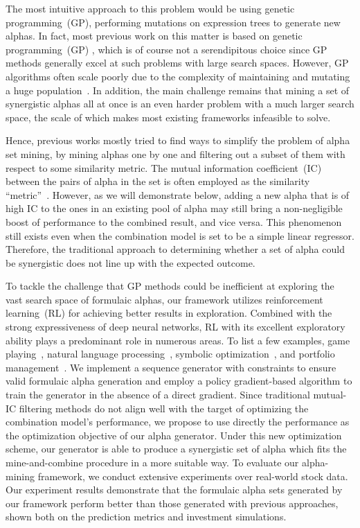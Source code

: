 The most intuitive approach to this problem would be using genetic programming~(GP), performing mutations on expression trees to generate new alphas. In fact, most previous work on this matter is based on genetic programming~(GP) \cite{huataigp,huataigp2,alphaevolve,autoalpha}, which is of course not a serendipitous choice since GP methods generally excel at such problems with large search spaces. 
However, GP algorithms often scale poorly due to the complexity of maintaining and mutating a huge population~\cite{dsr}. In addition, the main challenge remains that mining a set of synergistic alphas all at once is an even harder problem with a much larger search space, the scale of which makes most existing frameworks infeasible to solve. 

Hence, previous works mostly tried to find ways to simplify the problem of alpha set mining, by mining alphas one by one and filtering out a subset of them with respect to some similarity metric. The mutual information coefficient~(IC) between the pairs of alpha in the set is often employed as the similarity ``metric''~\cite{alphaevolve,autoalpha,huataigp}. However, as we will demonstrate below, adding a new alpha that is of high IC to the ones in an existing pool of alpha may still bring a non-negligible boost of performance to the combined result, and vice versa. This phenomenon still exists even when the combination model is set to be a simple linear regressor. Therefore, the traditional approach to determining whether a set of alpha could be synergistic does not line up with the expected outcome.

To tackle the challenge that GP methods could be inefficient at exploring the vast search space of formulaic alphas, our framework utilizes reinforcement learning~(RL) for achieving better results in exploration. 
Combined with the strong expressiveness of deep neural networks, RL with its excellent exploratory ability plays a predominant role in numerous areas. To list a few examples, game playing~\cite{muzero}, natural language processing~\cite{rlnlp}, symbolic optimization~\cite{dsr}, and portfolio management~\cite{deeptrader}. 
We implement a sequence generator with constraints to ensure valid formulaic alpha generation and employ a policy gradient-based algorithm to train the generator in the absence of a direct gradient.
Since traditional mutual-IC filtering methods do not align well with the target of optimizing the combination model's performance, we propose to use directly the performance as the optimization objective of our alpha generator.
Under this new optimization scheme, our generator is able to produce a synergistic set of alpha which fits the mine-and-combine procedure in a more suitable way. 
To evaluate our alpha-mining framework, we conduct extensive experiments over real-world stock data. Our experiment results demonstrate that the formulaic alpha sets generated by our framework perform better than those generated with previous approaches, shown both on the prediction metrics and investment simulations.

